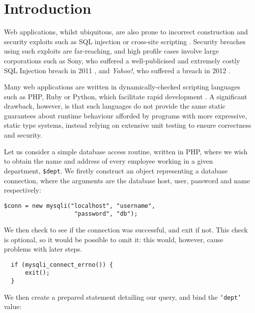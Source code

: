 \documentclass[preprint]{sigplanconf}
\begin{document}



\section{Introduction}

Web applications, whilst ubiquitous, are also prone to incorrect construction
and security exploits such as SQL injection \cite{owasp:sqli} or cross-site
scripting \cite{owasp:xss}. Security breaches using such exploits are
far-reaching, and high profile cases involve large corporations such as Sony,
who suffered a well-publicised and extremely costly SQL Injection breach in
2011 \cite{ieee:sony}, and \textit{Yahoo!}, who suffered a breach in 2012
\cite{imperva:yahoo}. 

Many web applications are written in dynamically-checked scripting languages
such as PHP, Ruby or Python, which facilitate rapid development
\cite{w3techs:webpls}. A significant drawback, however, is that such languages
do not provide  the same static guarantees about runtime behaviour afforded by
programs with more expressive, static type systems, instead relying on
extensive unit testing to ensure correctness and security. 

Let us consider a simple database access routine, written in
PHP, where we wish to obtain the name and address of every employee working in
a given department, \texttt{\$dept}. We firstly construct an object
representing a database connection, where the arguments are the database host,
user, password and name respectively:


%
\begin{Verbatim}
$conn = new mysqli("localhost", "username", 
                    "password", "db");
\end{Verbatim}
%
We then check to see if the connection was successful, and exit
if not.  This check is optional, so
it would be possible to omit it: this would, however, cause
problems with later steps.

%
\begin{Verbatim}
  if (mysqli_connect_errno()) {
      exit();
  }
\end{Verbatim}
%
We then create a prepared statement detailing our query, and bind the
\texttt{`dept'} value:
\end{document}
